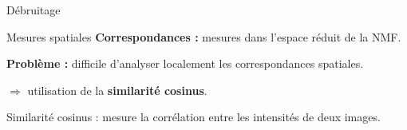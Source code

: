 \documentclass[10pt]{beamer}
\begin{document}
\begin{frame}{Débruitage}
\begin{figure}[ht]
 \end{figure}


\end{frame}



\begin{frame}{Mesures spatiales}
  \textbf{Correspondances :} mesures dans l'espace réduit de la NMF.

  \textbf{Problème :} difficile d'analyser localement les correspondances spatiales.
  
  $\Rightarrow$ utilisation de la \textbf{similarité cosinus}.

  \vspace{0.4cm}

  \alert{Similarité cosinus :} mesure la corrélation entre les intensités de deux images.
\end{frame}
\end{document}
